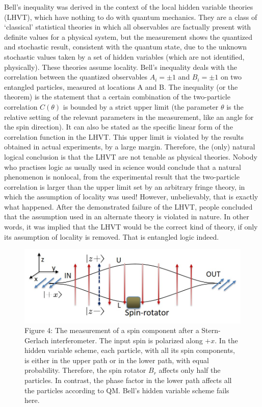 Bell's inequality \cite{chap27-key12} was derived in the context of the local hidden variable theories
(LHVT), which have nothing to do with quantum mechanics. They are a class of `classical'
statistical theories in which all observables are factually present with definite values for a
physical system, but the measurement shows the quantized and stochastic result, consistent
with the quantum state, due to the unknown stochastic values taken by a set of hidden variables (which are not identified, physically). These theories assume locality. Bell's inequality deals with the correlation between the quantized observables $A_i = \pm 1$ and $B_i = \pm 1$ on two
entangled particles, measured at locations A and B. The inequality (or the theorem) is the
statement that a certain combination of the two-particle correlation $C (\theta)$ is bounded by a
strict upper limit (the parameter $\theta$ is the relative setting of the relevant parameters in the
measurement, like an angle for the spin direction). It can also be stated as the specific linear
form of the correlation function in the LHVT. This upper limit is violated by the results
obtained in actual experiments, by a large margin. Therefore, the (only) natural logical
conclusion is that the LHVT are not tenable as physical theories. Nobody who practises
logic as usually used in science would conclude that a natural phenomenon is nonlocal, from
the experimental result that the two-particle correlation is larger than the upper limit set
by an arbitrary fringe theory, in which the assumption of locality was used! However, unbelievably, that is exactly what happened. After the demonstrated failure of the LHVT,
people concluded that the assumption used in an alternate theory is violated in nature. In
other words, it was implied that the LHVT would be the correct kind of theory, if only its
assumption of locality is removed. That is entangled logic indeed.
\begin{figure}[H]
\centering
\captionsetup{singlelinecheck = false, format= hang, justification=raggedright, font=footnotesize, labelsep=space}
\includegraphics[scale=0.55]{src/images/chap27/4.jpg}
\caption*{Figure 4: The measurement of a spin component after a Stern-Gerlach interferometer. The input spin
is polarized along $+x$. In the hidden variable scheme, each particle, with all its spin components,
is either in the upper path or in the lower path, with equal probability. Therefore, the spin rotator
$B_r$ affects only half the particles. In contrast, the phase factor in the lower path affects all the
particles according to QM. Bell's hidden variable scheme fails here.}
\end{figure}

